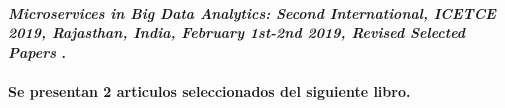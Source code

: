 
\paragraph{
    \textbf{\emph{Microservices in Big Data Analytics: Second International, {ICETCE} 2019, Rajasthan, India, February 1st-2nd 2019, Revised Selected Papers}
    }
    \cite{chaudhary_microservices_2020}.
}

\paragraph{
    Se presentan 2 articulos seleccionados del siguiente libro.
}



